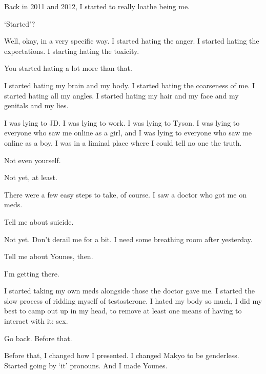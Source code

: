 \label{furry:younes}
\begin{paracol}{2}
  \begin{leftcolumn}

\noindent Back in 2011 and 2012, I started to really loathe being me.

\begin{ally}
`Started'?
\end{ally}
Well, okay, in a very specific way. I started hating the anger. I started hating the expectations. I starting hating the toxicity.

\begin{ally}
You started hating a lot more than that.
\end{ally}
I started hating my brain and my body. I started hating the coarseness of me. I started hating all my angles. I started hating my hair and my face and my genitals and my lies.

I was lying to JD. I was lying to work. I was lying to Tyson. I was lying to everyone who saw me online as a girl, and I was lying to everyone who saw me online as a boy. I was in a liminal place where I could tell no one the truth.

\begin{ally}
Not even yourself.
\end{ally}
Not yet, at least.

There were a few easy steps to take, of course. I saw a doctor who got me on meds.

\begin{ally}
Tell me about suicide.
\end{ally}
Not yet. Don't derail me for a bit. I need some breathing room after yesterday.

\begin{ally}
Tell me about Younes, then.
\end{ally}
I'm getting there.

I started taking my own meds alongside those the doctor gave me. I started the slow process of ridding myself of testosterone. I hated my body so much, I did my best to camp out up in my head, to remove at least one means of having to interact with it: sex.

\begin{ally}
Go back. Before that.
\end{ally}
Before that, I changed how I presented. I changed Makyo to be genderless. Started going by `it' pronouns. And I made Younes.


\end{leftcolumn}
\end{paracol}
